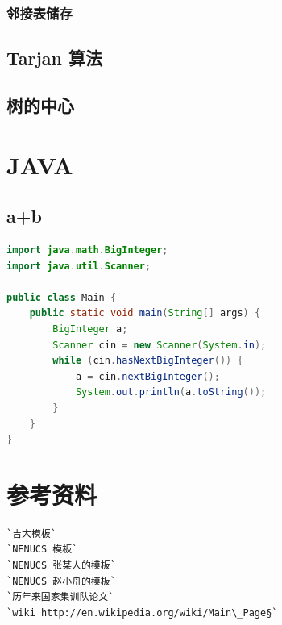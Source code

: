 \documentclass[a4paper]{article}
\begin{document}
\begin{CJK*}{UTF8}{gbsn}
\begin{multicols}{3}
\begin{flushleft}
\subsubsection{邻接表储存}


\subsection{Tarjan 算法}


\subsection{树的中心}


\section{JAVA}
\subsection{a+b}
\begin{lstlisting}[language={Java}]
import java.math.BigInteger;
import java.util.Scanner;

public class Main {
    public static void main(String[] args) {
        BigInteger a;
        Scanner cin = new Scanner(System.in);
        while (cin.hasNextBigInteger()) {
            a = cin.nextBigInteger();
            System.out.println(a.toString());
        }
    }
}
\end{lstlisting}

\section{参考资料}
\begin{lstlisting}
`吉大模板`
`NENUCS 模板`
`NENUCS 张某人的模板`
`NENUCS 赵小舟的模板`
`历年来国家集训队论文`
`wiki http://en.wikipedia.org/wiki/Main\_Page§`
\end{lstlisting}

\end{flushleft}
\clearpage
\end{multicols}
\end{CJK*}
\end{document}
